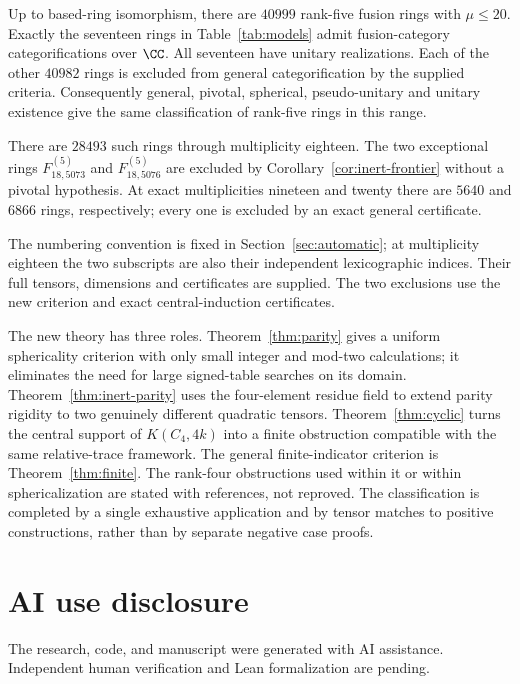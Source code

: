 \documentclass[11pt]{article}
\newcommand{\F}[2]{F^{(5)}_{#1,#2}}
\begin{document}
\begin{theorem}\label{thm:main}
Up to based-ring isomorphism, there are $40999$ rank-five fusion rings
with $\mu\le20$. Exactly the seventeen rings in
Table~\ref{tab:models} admit fusion-category categorifications over $\CC$.
All seventeen have unitary realizations. Each of the other $40982$ rings
is excluded from general categorification by the supplied criteria.
Consequently general, pivotal, spherical, pseudo-unitary and unitary
existence give the same classification of rank-five rings in this range.

There are $28493$ such rings through multiplicity eighteen. The two
exceptional rings $\F{18}{5073}$ and $\F{18}{5076}$ are excluded by
Corollary~\ref{cor:inert-frontier} without a pivotal
hypothesis. At exact multiplicities nineteen and twenty there are
$5640$ and $6866$ rings, respectively; every one is excluded by an
exact general certificate.
\end{theorem}

The numbering convention is fixed in Section~\ref{sec:automatic}; at
multiplicity eighteen the two subscripts are also their independent
lexicographic indices. Their full tensors, dimensions and certificates
are supplied. The two exclusions use the new criterion and exact
central-induction certificates.

The new theory has three roles. Theorem~\ref{thm:parity} gives a uniform
sphericality criterion with only small integer and mod-two calculations;
it eliminates the need for large signed-table searches on its domain.
Theorem~\ref{thm:inert-parity} uses the four-element residue field to
extend parity rigidity to two genuinely different quadratic tensors.
Theorem~\ref{thm:cyclic} turns the central support of $K(C_4,4k)$ into a
finite obstruction compatible with the same relative-trace framework.
The general finite-indicator criterion is Theorem~\ref{thm:finite}.
The rank-four obstructions used within it or within sphericalization are
stated with references, not reproved. The classification is completed by
a single exhaustive application and by tensor matches to positive
constructions, rather than by separate negative case proofs.









\section*{AI use disclosure}
The research, code, and manuscript were generated with AI assistance. Independent human verification and Lean formalization are pending.

\end{document}
